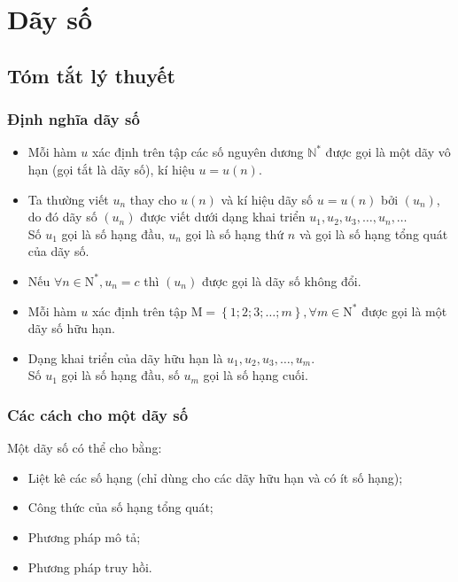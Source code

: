 \def\tenchude{DÃY SỐ}
\setcounter{section}{4}
\setcounter{dang}{0}
\setcounter{ex}{0}
\setcounter{bt}{0}
\setcounter{vd}{0}
\section{Dãy số}
\subsection{Tóm tắt lý thuyết}
\begin{tomtat}
	\subsubsection{Định nghĩa dãy số} 
	\begin{itemize}
		\item Mỗi hàm $u$ xác định trên tập các số nguyên dương $\mathbb{N^{*}}$ được gọi là một dãy vô hạn (gọi tắt là dãy số), kí hiệu $u=u(n)$.
		\item 	Ta thường viết $u_n$ thay cho $u(n)$ và kí hiệu dãy số $u=u(n)$ bởi $(u_n)$, do đó dãy số $(u_n)$ được viết dưới dạng khai triển $u_1, u_2, u_3, \ldots, u_n, \ldots$\\
		Số $u_1$ gọi là số hạng đầu, $u_n$ gọi là số hạng thứ $n$ và gọi là số hạng tổng quát của dãy số.
		\item Nếu $\forall n \in \mathrm{N^*}, u_n=c$ thì $(u_n)$ được gọi là dãy số không đổi.
		\item Mỗi hàm $u$ xác định trên tập $\mathrm{M}=\left\{1;2;3;\ldots;m\right\}, \forall m \in \mathrm{N^*}$ được gọi là một dãy số hữu hạn.
		\item Dạng khai triển của dãy hữu hạn là $u_1, u_2, u_3, \ldots, u_m$.\\
		Số $u_1$ gọi là số hạng đầu, số $u_m$ gọi là số hạng cuối.
		
	\end{itemize}
	\subsubsection{Các cách cho một dãy số}
	Một dãy số có thể cho bằng:
	\begin{itemize}
		\item Liệt kê các số hạng (chỉ dùng cho các dãy hữu hạn và có ít số hạng);
		\item Công thức của số hạng tổng quát;
		\item Phương pháp mô tả;
		\item Phương pháp truy hồi.
	\end{itemize}

\end{tomtat}
